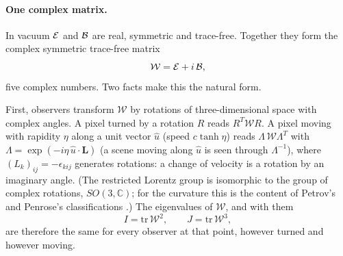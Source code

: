 \paragraph{One complex matrix.} In vacuum $\mathcal{E}$ and $\mathcal{B}$ are real, symmetric and
trace-free. Together they form the complex symmetric trace-free matrix
\begin{equation}\label{eq:W}
\mathcal{W} = \mathcal{E} + i\,\mathcal{B} ,
\end{equation}
five complex numbers. Two facts make this the natural form.

First, observers transform $\mathcal{W}$ by rotations of three-dimensional space with
complex angles. A pixel turned by a rotation $R$ reads $R^{T}\mathcal{W} R$. A pixel moving
with rapidity $\eta$ along a unit vector $\hat u$ (speed $c\tanh\eta$) reads
$\Lambda\,\mathcal{W}\Lambda^{T}$ with $\Lambda = \exp(-i\eta\,\hat u\cdot\mathbf{L})$ (a scene moving
along $\hat u$ is seen through $\Lambda^{-1}$), where
$(L_k)_{ij} = -\epsilon_{kij}$ generates rotations: a change of velocity is a
rotation by an imaginary angle. (The restricted Lorentz group is isomorphic to the group of
complex rotations, $SO(3,\mathbb{C})$; for the curvature this is the content of
Petrov's and Penrose's classifications \cite{Petrov2000,Penrose1960}.) The
eigenvalues of $\mathcal{W}$, and with them
\begin{equation}\label{eq:invariants}
I = \mathrm{tr}\,\mathcal{W}^2, \qquad J = \mathrm{tr}\,\mathcal{W}^3,
\end{equation}
are therefore the same for every observer at that point, however turned and
however moving.

